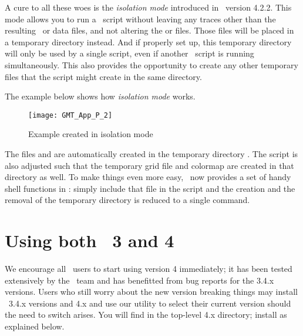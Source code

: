 A cure to all these woes is the \emph{isolation mode} introduced in \GMT\ version
4.2.2. This mode allows you to run a \GMT\ script without leaving any traces other
than the resulting \PS\  or data files, and not altering the 
or  files. Those files will be placed in a temporary directory
instead. And if properly set up, this temporary directory will only be used by a
single script, even if another \GMT\ script is running simultaneously. This also
provides the opportunity to create any other temporary files that the script might
create in the same directory.

The example below shows how \emph{isolation mode} works.


\begin{figure}[h]
\centering
\texttt{[image: GMT\_App\_P\_2]}
\caption{Example created in isolation mode}
\label{fig:GMT_App_P_2}
\end{figure}

The files  and  are automatically created
in the temporary directory . The script is also adjusted such
that the temporary grid file  and colormap  are created
in that directory as well. To make things even more easy, \GMT\ now provides a set of
handy shell functions in : simply include that file
in the script and the creation and the removal of the temporary directory is reduced to a single command.


\section{Using both \gmt\ 3 and 4}

We encourage all \GMT\ users to start using version 4 immediately; it has been tested extensively by
the \GMT\ team and has benefitted from bug reports for the 3.4.x versions.  Users who still worry about the
new version breaking things may install \GMT\ 3.4.x versions and 4.x and use our utility 
to select their current version should the need to switch arises.  You will find 
in the top-level \GMT 4.x directory; install as explained below.

